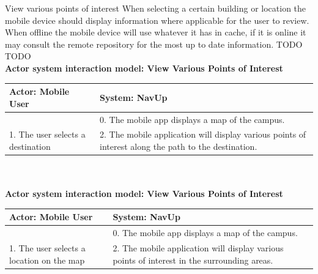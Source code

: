 \FuncReq
{View various points of interest}
{When selecting a certain building or location the mobile device should display information where applicable for the user to review. When offline the mobile device will use whatever it has in cache, if it is online it may consult the remote repository for the most up to date information.}
{TODO}
{TODO}
	\\
    \textbf{Actor system interaction model: View Various Points of Interest }\\
    \begin{tabular}{ | p{6cm} | p{6cm} |}
    \hline
    Actor: Mobile User & System: NavUp \\ \hline
    & 0. The mobile app displays a map of the campus.\\ \hline
    1. The user selects a destination & 2. The mobile application will display various points of interest along the path to the destination.\\ \hline
    \end{tabular}
\\
\bigskip
	\\
    \textbf{Actor system interaction model: View Various Points of Interest }\\
    \begin{tabular}{ | p{6cm} | p{6cm} |}
    \hline
    Actor: Mobile User & System: NavUp \\ \hline
    & 0. The mobile app displays a map of the campus.\\ \hline
    1. The user selects a location on the map & 2. The mobile application will display various points of interest in the surrounding areas.\\ \hline
    \end{tabular}
\\
\bigskip

